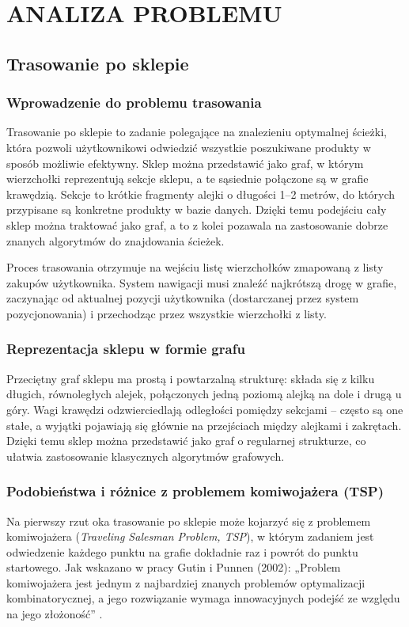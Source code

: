 \chapter{ANALIZA PROBLEMU}
\label{chapter:analiza_problemu}

\section{Trasowanie po sklepie}

\subsection{Wprowadzenie do problemu trasowania}

Trasowanie po sklepie to zadanie polegające na znalezieniu optymalnej ścieżki, która pozwoli użytkownikowi odwiedzić wszystkie poszukiwane produkty w sposób możliwie efektywny. Sklep można przedstawić jako graf, w którym wierzchołki reprezentują sekcje sklepu, a te sąsiednie połączone są w grafie krawędzią. Sekcje to krótkie fragmenty alejki o długości 1–2 metrów, do których przypisane są konkretne produkty w bazie danych. Dzięki temu podejściu cały sklep można traktować jako graf, a to z kolei pozawala na zastosowanie dobrze znanych algorytmów do znajdowania ścieżek.

Proces trasowania otrzymuje na wejściu listę wierzchołków zmapowaną z listy zakupów użytkownika. System nawigacji musi znaleźć najkrótszą drogę w grafie, zaczynając od aktualnej pozycji użytkownika (dostarczanej przez system pozycjonowania) i przechodząc przez wszystkie wierzchołki z listy.

\subsection{Reprezentacja sklepu w formie grafu}
Przeciętny graf sklepu ma prostą i powtarzalną strukturę: składa się z kilku długich, równoległych alejek, połączonych jedną poziomą alejką na dole i drugą u góry. Wagi krawędzi odzwierciedlają odległości pomiędzy sekcjami – często są one stałe, a wyjątki pojawiają się głównie na przejściach między alejkami i zakrętach. Dzięki temu sklep można przedstawić jako graf o regularnej strukturze, co ułatwia zastosowanie klasycznych algorytmów grafowych.

\subsection{Podobieństwa i różnice z problemem komiwojażera (TSP)}
Na pierwszy rzut oka trasowanie po sklepie może kojarzyć się z problemem komiwojażera (\textit{Traveling Salesman Problem, TSP}), w którym zadaniem jest odwiedzenie każdego punktu na grafie dokładnie raz i powrót do punktu startowego. Jak wskazano w pracy Gutin i Punnen (2002): „Problem komiwojażera jest jednym z najbardziej znanych problemów optymalizacji kombinatorycznej, a jego rozwiązanie wymaga innowacyjnych podejść ze względu na jego złożoność” \cite{Gutin2002}.

